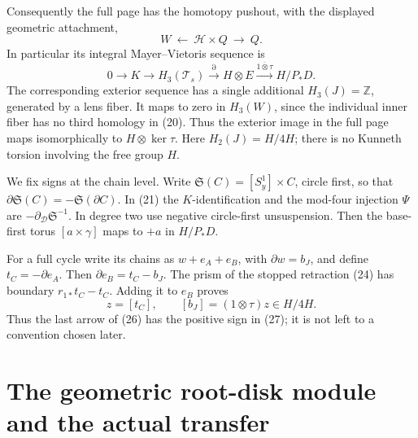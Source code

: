 \documentclass[11pt]{article}
\newcommand{\Z}{\mathbb Z}
\newcommand{\calH}{\mathcal H}
\newcommand{\calD}{\mathcal D}
\begin{document}
Consequently the full page has the homotopy pushout, with
the displayed geometric attachment,
\[
                W\ \longleftarrow\ \calH\times Q\
                   \longrightarrow\ Q.           \tag{25}
\]
In particular its integral Mayer--Vietoris sequence is
\[
 0\longrightarrow K\longrightarrow H_3(\mathcal T_s)
 \xrightarrow{\partial}H\otimes E
 \xrightarrow{\overline{1\otimes\tau}}H/P_*D.       \tag{26}
\]
The corresponding exterior sequence has a single additional
\(H_3(J)=\Z\), generated by a lens fiber. It maps to zero in
\(H_3(W)\), since the individual inner fiber has no third
homology in (20). Thus the exterior image in the full page maps
isomorphically to \(H\otimes\ker\tau\).
Here \(H_2(J)=H/4H\); there is no Kunneth torsion involving
the free group \(H\).

We fix signs at the chain level. Write
\(\mathfrak S(C)=[S^1_y]\times C\), circle first, so that
\(\partial\mathfrak S(C)=-\mathfrak S(\partial C)\).
In (21) the \(K\)-identification and the mod-four injection
\(\Psi\) are \(-\partial_{\calD}\mathfrak S^{-1}\).
In degree two use negative circle-first unsuspension.
Then the base-first torus \([a\times\gamma]\) maps to
\(+a\) in \(H/P_*D\).

For a full cycle write its chains as \(w+e_A+e_B\), with
\(\partial w=b_J\), and define \(t_C=-\partial e_A\).
Then \(\partial e_B=t_C-b_J\).
The prism of the stopped retraction (24) has boundary
\(r_{1*}t_C-t_C\). Adding it to \(e_B\) proves
\[
 z=[t_C],\qquad [b_J]=(1\otimes\tau)z\in H/4H.       \tag{27}
\]
Thus the last arrow of (26) has the positive sign in (27);
it is not left to a convention chosen later.

\section{The geometric root-disk module and the actual transfer}
\end{document}
